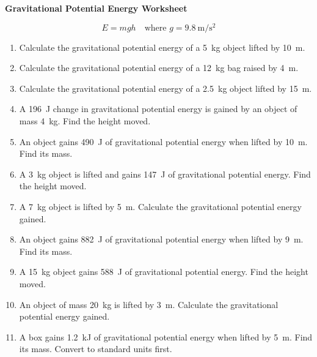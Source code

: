 \documentclass[12pt]{article}
\begin{document}
\begin{center}
    {\LARGE \textbf{Gravitational Potential Energy Worksheet}}
\end{center}

\vspace{0.5cm}

\[
E = mgh \quad \text{where } g = \SI{9.8}{\metre\per\second\squared}
\]

\begin{enumerate}[itemsep=1.2em]

\item Calculate the gravitational potential energy of a \SI{5}{\kilogram} object lifted by \SI{10}{\metre}.

\item Calculate the gravitational potential energy of a \SI{12}{\kilogram} bag raised by \SI{4}{\metre}.

\item Calculate the gravitational potential energy of a \SI{2.5}{\kilogram} object lifted by \SI{15}{\metre}.

\item A \SI{196}{\joule} change in gravitational potential energy is gained by an object of mass \SI{4}{\kilogram}.  
Find the height moved.

\item An object gains \SI{490}{\joule} of gravitational potential energy when lifted by \SI{10}{\metre}.  
Find its mass.

\item A \SI{3}{\kilogram} object is lifted and gains \SI{147}{\joule} of gravitational potential energy.  
Find the height moved.

\item A \SI{7}{\kilogram} object is lifted by \SI{5}{\metre}.  
Calculate the gravitational potential energy gained.

\item An object gains \SI{882}{\joule} of gravitational potential energy when lifted by \SI{9}{\metre}.  
Find its mass.

\item A \SI{15}{\kilogram} object gains \SI{588}{\joule} of gravitational potential energy.  
Find the height moved.

\item An object of mass \SI{20}{\kilogram} is lifted by \SI{3}{\metre}.  
Calculate the gravitational potential energy gained.

\item A box gains \SI{1.2}{\kilo\joule} of gravitational potential energy when lifted by \SI{5}{\metre}.  
Find its mass. Convert to standard units first.


\end{enumerate}
\end{document}
